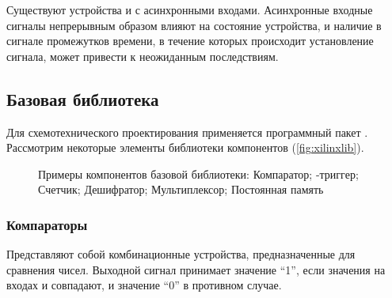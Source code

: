 Существуют устройства и с асинхронными входами. Асинхронные входные сигналы непрерывным образом влияют на состояние устройства, и наличие в сигнале промежутков времени, в течение которых происходит установление сигнала, может привести к неожиданным последствиям.

\subsection{Базовая библиотека }

Для схемотехнического проектирования применяется программный пакет . Рассмотрим некоторые элементы библиотеки компонентов  (\autoref{fig:xilinxlib}).

\begin{figure}[h]%
\centering
%
%
\hspace{8pt}%
%
%
\hspace{8pt}%
%
%
\hspace{8pt}%
%
%
\hspace{8pt}%
%
%
\hspace{8pt}%
%
%
\hspace{8pt}%
%
\caption[Компоненты базовой библиотеки.]{Примеры компонентов базовой библиотеки:
 Компаратор; %
 -триггер; %
 Счетчик; %
 Дешифратор; %
 Мультиплексор; %
 Постоянная память}%
\label{fig:xilinxlib}%
\end{figure}

\subsubsection{Компараторы}

Представляют собой комбинационные устройства, предназначенные для сравнения чисел. Выходной сигнал  принимает значение \enquote{1}, если значения на входах  и  совпадают, и значение \enquote{0} в противном случае.

